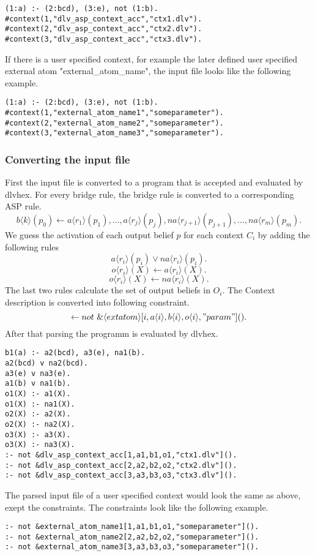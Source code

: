 \documentclass[11pt]{article}
\begin{document}
\lstset{language=JAVA}
\begin{lstlisting}[caption={example for input file},frame=tlrb]
(1:a) :- (2:bcd), (3:e), not (1:b).
#context(1,"dlv_asp_context_acc","ctx1.dlv").
#context(2,"dlv_asp_context_acc","ctx2.dlv").
#context(3,"dlv_asp_context_acc","ctx3.dlv").
\end{lstlisting}
If there is a user specified context, for example the later defined user specified external atom "external\_atom\_name", the input file looks like the following example.
\lstset{language=JAVA}
\begin{lstlisting}[caption={example for user specified context in input file},frame=tlrb]
(1:a) :- (2:bcd), (3:e), not (1:b).
#context(1,"external_atom_name1","someparameter").
#context(2,"external_atom_name2","someparameter").
#context(3,"external_atom_name3","someparameter").
\end{lstlisting}
\subsubsection{Converting the input file}
First the input file is converted to a program that is accepted and evaluated by dlvhex. For every bridge rule, the bridge rule is converted to a corresponding ASP rule.
\[ b\langle k\rangle(p_{0}) \leftarrow a\langle r_{1}\rangle (p_{1}), \ldots , a\langle r_{j}\rangle(p_{j}), na\langle r_{j+1}\rangle(p_{j+1}), \ldots , na\langle r_{m}\rangle(p_{m}). \]
We guess the activation of each output belief \(p\)  for each context \(C_{i}\) by adding the following rules
\[ a\langle r_{i}\rangle(p_{i}) \lor na\langle r_{i}\rangle(p_{i}). \]
\[ o\langle r_{i}\rangle(X) \leftarrow a\langle r_{i}\rangle(X). \]
\[ o\langle r_{i}\rangle(X) \leftarrow na\langle r_{i}\rangle(X). \]
The last two rules calculate the set of output beliefs in \(O_{i}\).
The Context description is converted into following constraint.
\[ \leftarrow not\ \&\langle extatom\rangle [i,a\langle i\rangle,b\langle i\rangle,o\langle i\rangle,"param"]().\]
After that parsing the programm is evaluated by dlvhex.
\pagebreak
\lstset{language=C}
\begin{lstlisting}[caption={converted input file},frame=tlrb]
b1(a) :- a2(bcd), a3(e), na1(b).
a2(bcd) v na2(bcd).
a3(e) v na3(e).
a1(b) v na1(b).
o1(X) :- a1(X).
o1(X) :- na1(X).
o2(X) :- a2(X).
o2(X) :- na2(X).
o3(X) :- a3(X).
o3(X) :- na3(X).
:- not &dlv_asp_context_acc[1,a1,b1,o1,"ctx1.dlv"]().
:- not &dlv_asp_context_acc[2,a2,b2,o2,"ctx2.dlv"]().
:- not &dlv_asp_context_acc[3,a3,b3,o3,"ctx3.dlv"]().
\end{lstlisting}
The parsed input file of a user specified context would look the same as above, exept the constraints. The constraints look like the following example.
\lstset{language=C}
\begin{lstlisting}[caption={converted input file with a user specified context},frame=tlrb]
:- not &external_atom_name1[1,a1,b1,o1,"someparameter"]().
:- not &external_atom_name2[2,a2,b2,o2,"someparameter"]().
:- not &external_atom_name3[3,a3,b3,o3,"someparameter"]().
\end{lstlisting}
\end{document}

